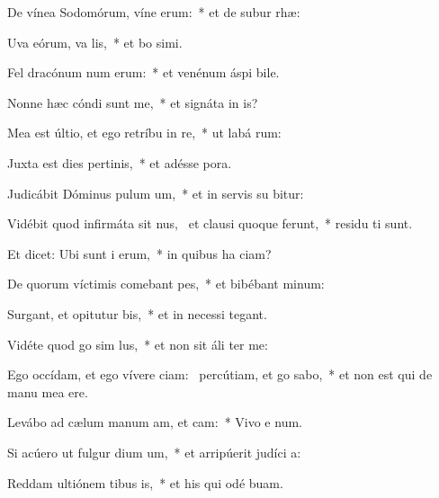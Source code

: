 \item De vínea Sodomórum, víne erum:~* et de subur rhæ:
\item Uva eórum, va lis,~* et bo simi.
\item Fel dracónum num erum:~* et venénum áspi bile.
\item Nonne hæc cóndi sunt  me,~* et signáta in  is?
\item Mea est últio, et ego retríbu in re,~* ut labá  rum:
\item Juxta est dies pertinis,~* et adésse  pora.
\item Judicábit Dóminus pulum um,~* et in servis su bitur:
\item Vidébit quod infirmáta sit nus,~\pscross{} et clausi quoque ferunt,~* residu ti sunt.
\item Et dicet: Ubi sunt i erum,~* in quibus ha ciam?
\item De quorum víctimis comebant pes,~* et bibébant  minum:
\item Surgant, et opitutur bis,~* et in necessi  tegant.
\item Vidéte quod go sim lus,~* et non sit áli  ter me:
\item Ego occídam, et ego vívere ciam:~\pscross{} percútiam, et go sabo,~* et non est qui de manu mea  ere.
\item Levábo ad cælum manum am, et cam:~* Vivo e  num.
\item Si acúero ut fulgur dium um,~* et arripúerit judíci  a:
\item Reddam ultiónem tibus is,~* et his qui odé  buam.
